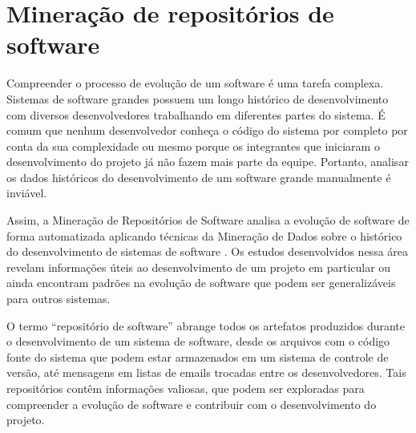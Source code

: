 \documentclass[a4paper, 12pt, twoside]{book}
\begin{document}
    \section{Mineração de repositórios de software} \label{sc:mineracao}
        Compreender o processo de evolução de um software é uma tarefa complexa. Sistemas de software grandes possuem um longo histórico de desenvolvimento com diversos desenvolvedores trabalhando em diferentes partes do sistema. É comum que nenhum desenvolvedor conheça o código do sistema por completo por conta da sua complexidade ou mesmo porque os integrantes que iniciaram o desenvolvimento do projeto já não fazem mais parte da equipe. Portanto, analisar os dados históricos do desenvolvimento de um software grande manualmente é inviável. 

        Assim, a Mineração de Repositórios de Software analisa a evolução de software de forma automatizada aplicando técnicas da Mineração de Dados sobre o histórico do desenvolvimento de sistemas de software \cite{workshop-gustavo-aniche}. Os estudos desenvolvidos nessa área revelam informações úteis ao desenvolvimento de um projeto em particular ou ainda encontram padrões na evolução de software que podem ser generalizáveis para outros sistemas.

        O termo ``repositório de software'' abrange todos os artefatos produzidos durante o 
        desenvolvimento de um sistema de software, desde os arquivos com o código fonte do sistema que 
        podem estar armazenados em um sistema de controle de versão, até mensagens em listas de
        emails trocadas entre os desenvolvedores. Tais repositórios contêm informações valiosas, 
        que podem ser exploradas para compreender a evolução de software e contribuir com o 
        desenvolvimento do projeto.
\end{document}
